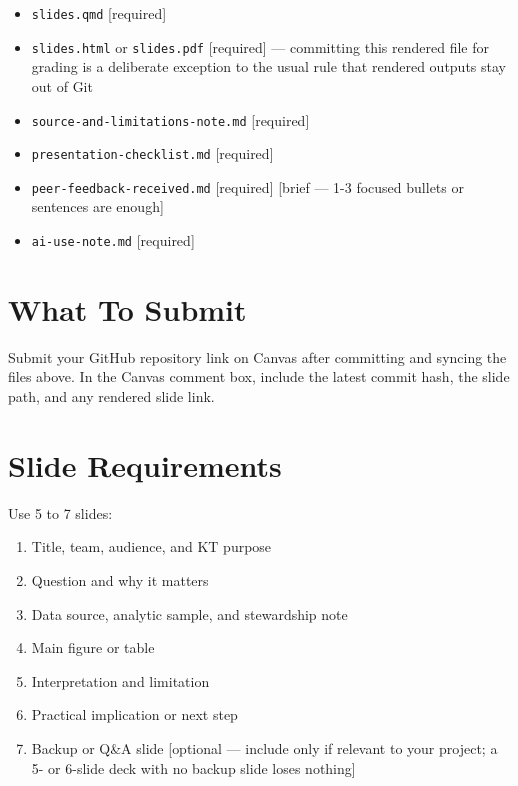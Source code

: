 \documentclass[
  letterpaper,
  DIV=11,
  numbers=noendperiod,
  oneside]{scrreprt}
\providecommand{\tightlist}{%
  \setlength{\itemsep}{0pt}\setlength{\parskip}{0pt}}
\begin{document}
\begin{itemize}
\tightlist
\item
  \texttt{slides.qmd} {[}required{]}
\item
  \texttt{slides.html} or \texttt{slides.pdf} {[}required{]} ---
  committing this rendered file for grading is a deliberate exception to
  the usual rule that rendered outputs stay out of Git
\item
  \texttt{source-and-limitations-note.md} {[}required{]}
\item
  \texttt{presentation-checklist.md} {[}required{]}
\item
  \texttt{peer-feedback-received.md} {[}required{]} {[}brief --- 1-3
  focused bullets or sentences are enough{]}
\item
  \texttt{ai-use-note.md} {[}required{]}
\end{itemize}

\section{What To Submit}\label{what-to-submit-15}

Submit your GitHub repository link on Canvas after committing and
syncing the files above. In the Canvas comment box, include the latest
commit hash, the slide path, and any rendered slide link.

\section{Slide Requirements}\label{slide-requirements}

Use 5 to 7 slides:

\begin{enumerate}
\def\labelenumi{\arabic{enumi}.}
\tightlist
\item
  Title, team, audience, and KT purpose
\item
  Question and why it matters
\item
  Data source, analytic sample, and stewardship note
\item
  Main figure or table
\item
  Interpretation and limitation
\item
  Practical implication or next step
\item
  Backup or Q\&A slide {[}optional --- include only if relevant to your
  project; a 5- or 6-slide deck with no backup slide loses nothing{]}
\end{enumerate}
\end{document}
